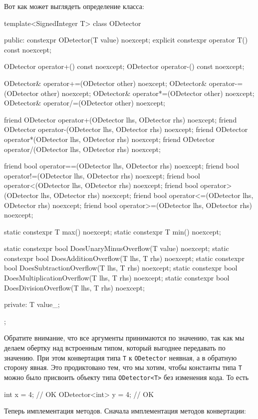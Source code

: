 Вот как может выглядеть определение класса:
\begin{cppcode}
template<SignedInteger T>
class ODetector {
public:
  constexpr ODetector(T value) noexcept;
  explicit constexpr operator T() const noexcept;

  ODetector operator+() const noexcept;
  ODetector operator-() const noexcept;
  
  ODetector& operator+=(ODetector other) noexcept;
  ODetector& operator-=(ODetector other) noexcept;
  ODetector& operator*=(ODetector other) noexcept;
  ODetector& operator/=(ODetector other) noexcept;
    
  friend ODetector operator+(ODetector lhs, ODetector rhs) noexcept;
  friend ODetector operator-(ODetector lhs, ODetector rhs) noexcept;
  friend ODetector operator*(ODetector lhs, ODetector rhs) noexcept;
  friend ODetector operator/(ODetector lhs, ODetector rhs) noexcept;
  
  friend bool operator==(ODetector lhs, ODetector rhs) noexcept;
  friend bool operator!=(ODetector lhs, ODetector rhs) noexcept;
  friend bool operator<(ODetector lhs, ODetector rhs) noexcept;
  friend bool operator>(ODetector lhs, ODetector rhs) noexcept;
  friend bool operator<=(ODetector lhs, ODetector rhs) noexcept;
  friend bool operator>=(ODetector lhs, ODetector rhs) noexcept;
    
  static constexpr T max() noexcept;
  static constexpr T min() noexcept;

  static constexpr bool DoesUnaryMinusOverflow(T value) noexcept;
  static constexpr bool DoesAdditionOverflow(T lhs, T rhs) noexcept;
  static constexpr bool DoesSubtractionOverflow(T lhs, T rhs) noexcept;
  static constexpr bool DoesMultiplicationOverflow(T lhs, T rhs) noexcept;
  static constexpr bool DoesDivisionOverflow(T lhs, T rhs) noexcept;

private:
  T value_;
};
\end{cppcode}
Обратите внимание, что все аргументы принимаются по значению, так как мы делаем обертку над встроенным типом, который выгоднее передавать по значению.
При этом конвертация типа \verb"T" к \verb"ODetector" неявная, а в обратную сторону явная.
Это продиктовано тем, что мы хотим, чтобы константы типа \verb"T" можно было присвоить объекту типа \verb"ODetector<T>" без изменения кода.
То есть
\begin{cppcode}
int x = 4; // OK
ODetector<int> y = 4; // OK
\end{cppcode}
Теперь имплементация методов.
Сначала имплементация методов конвертации:
